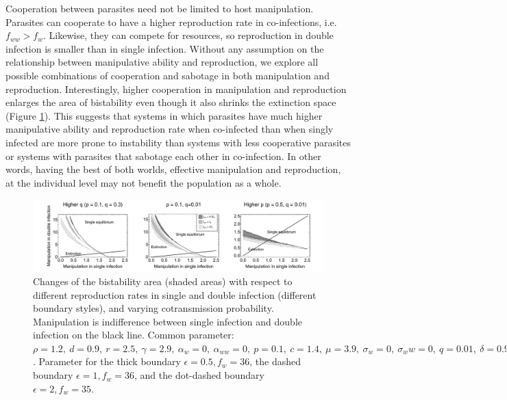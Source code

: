 \documentclass[11pt]{article}
\begin{document}
Cooperation between parasites need not be limited to host manipulation. 
Parasites can cooperate to have a higher reproduction rate in co-infections, i.e. $f_{ww} > f_w$. 
Likewise, they can compete for resources, so reproduction in double infection is smaller than in single infection. 
Without any assumption on the relationship between manipulative ability and reproduction, we explore all possible combinations of cooperation and sabotage in both manipulation and reproduction.
Interestingly, higher cooperation in manipulation and reproduction enlarges the area of bistability even though it also shrinks the extinction space (Figure \ref{fig:manipbifur}). 
This suggests that systems in which parasites have much higher manipulative ability and reproduction rate when co-infected than when singly infected are more prone to instability than systems with less cooperative parasites or systems with parasites that sabotage each other in co-infection. 
In other words, having the best of both worlds, effective manipulation and reproduction, at the individual level may not benefit the population as a whole.

\begin{figure}[!ht]
\centering
\includegraphics[width=\textwidth]{Figures/manip_bifurcation.pdf}
\caption{Changes of the bistability area (shaded areas) with respect to different reproduction rates in single and double infection (different boundary styles), and varying cotransmission probability. Manipulation is indifference between single infection and double infection on the black line. Common parameter:  $\rho = 1.2, \ d = 0.9, \ r = 2.5, \ \gamma = 2.9, \ \alpha_w = 0, \ \alpha_{ww} = 0, \ p = 0.1, \ c = 1.4, \ \mu = 3.9, \ \sigma_w = 0, \ \sigma_ww = 0, \ q = 0.01, \ \delta = 0.9, \ k = 0.26, \ \epsilon = 0.5$. Parameter for the thick boundary $\epsilon = 0.5, f_w = 36$, the dashed boundary $\epsilon = 1, f_w = 36$, and the dot-dashed boundary $\epsilon = 2, f_w = 35$.}
\label{fig:manipbifur}
\end{figure}
\end{document}
